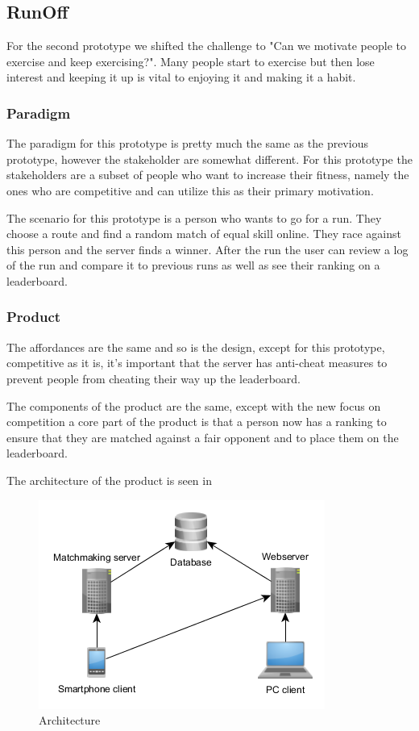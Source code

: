\subsection{RunOff}
For the second prototype we shifted the challenge to "Can we motivate people to exercise and keep exercising?". Many people start to exercise but then lose interest and keeping it up is vital to enjoying it and making it a habit. 

\subsubsection{Paradigm}
The paradigm for this prototype is pretty much the same as the previous prototype, however the stakeholder are somewhat different. For this prototype the stakeholders are a subset of people who want to increase their fitness, namely the ones who are competitive and can utilize this as their primary motivation. 
\vspace{10pt}

The scenario for this prototype is a person who wants to go for a run. They choose a route and find a random match of equal skill online. They race against this person and the server finds a winner. After the run the user can review a log of the run and compare it to previous runs as well as see their ranking on a leaderboard. 

\subsubsection{Product}
The affordances are the same and so is the design, except for this prototype, competitive as it is, it's important that the server has anti-cheat measures to prevent people from cheating their way up the leaderboard.
\vspace{10pt}

The components of the product are the same, except with the new focus on competition a core part of the product is that a person now has a ranking to ensure that they are matched against a fair opponent and to place them on the leaderboard.
\vspace{10pt}

The architecture of the product is seen in

\begin{figure}[ht]
\begin{center}
 \caption{Architecture}
 \label{fig:architecture}
 \includegraphics[scale=0.75]{img/architecture.png}
\end{center}
\end{figure}


